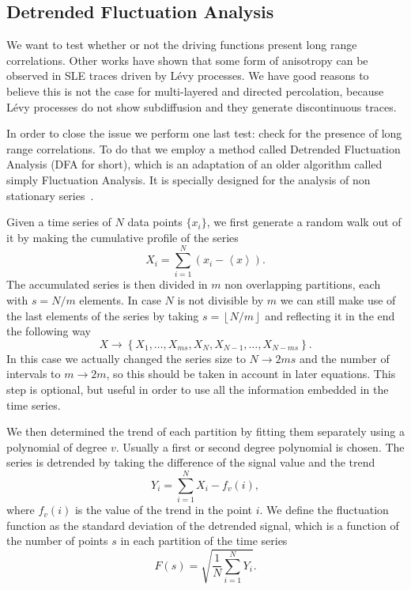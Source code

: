 \subsection{Detrended Fluctuation Analysis}
\label{sec:dfa}

We want to test whether or not the driving functions present long range
correlations. Other works have shown that some form of anisotropy can be
observed in SLE traces driven by L\'evy processes. We have good reasons to
believe this is not the case for multi-layered and directed percolation,
because L\'evy processes do not show subdiffusion and they generate
discontinuous traces.

In order to close the issue we perform one last test: check for the presence of
long range correlations. To do that we employ a method called Detrended
Fluctuation Analysis (DFA for short), which is an adaptation of an older
algorithm called simply Fluctuation Analysis. It is specially designed for the
analysis of non stationary series~\cite{Peng1993, Hardstone2012}.

Given a time series of $N$ data points $\{x_i\}$, we first generate a random walk
out of it by making the cumulative profile of the series
\begin{equation}
    X_i = \sum_{i=1}^{N} \left({x_i - \left\langle x \right\rangle}\right).
\end{equation}
The accumulated series is then divided in $m$ non overlapping partitions, each with
$s = N/m$ elements. In case $N$ is not divisible by $m$ we can still make use
of the last elements of the series by taking $s=\left\lfloor N/m\right\rfloor$
and reflecting it in the end the following way
\begin{equation}
    X\rightarrow\left\{X_1, \ldots, X_{ms},
                       X_{N}, X_{N - 1}, \ldots,
                       X_{N - ms}\right\}.
\end{equation}
In this case we actually changed the series size to $N\rightarrow2ms$ and the
number of intervals to $m\rightarrow2m$, so this should be taken in account in
later equations. This step is optional, but useful in order to use all the
information embedded in the time series.

We then determined the trend of each partition by fitting them separately using
a polynomial of degree $v$. Usually a first or second degree polynomial is
chosen. The series is detrended by taking the difference of the signal value and
the trend 
\begin{equation}
    Y_i = \sum_{i=1}^{N} X_i - f_v(i),
\end{equation}
where $f_v(i)$ is the value of the trend in the point $i$. We define the fluctuation
function as the standard deviation of the detrended signal, which is a function
of the number of points $s$ in each partition of the time series
\begin{equation}
    F(s) = \sqrt{\frac{1}{N}\sum_{i=1}^{N}Y_i}.
\end{equation}

